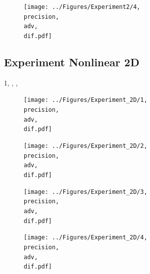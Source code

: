 \documentclass{scrartcl}
\begin{document}
	\begin{figure}[H]
		\centering
		\texttt{[image: ../Figures/Experiment2/4, \\precision, \\adv, \\dif.pdf]}
	\end{figure}
	
	\subsection{Experiment Nonlinear 2D}
	{1, \precision, \adv, \dif}
	\begin{figure}[H]
		\centering
		\texttt{[image: ../Figures/Experiment\_2D/1, \\precision, \\adv, \\dif.pdf]}
	\end{figure}
	
	\begin{figure}[H]
		\centering
		\texttt{[image: ../Figures/Experiment\_2D/2, \\precision, \\adv, \\dif.pdf]}
	\end{figure}
	
	\begin{figure}[H]
		\centering
		\texttt{[image: ../Figures/Experiment\_2D/3, \\precision, \\adv, \\dif.pdf]}
	\end{figure}
	
	\begin{figure}[H]
		\centering
		\texttt{[image: ../Figures/Experiment\_2D/4, \\precision, \\adv, \\dif.pdf]}
	\end{figure}
	
	
	
	
	
\end{document}
